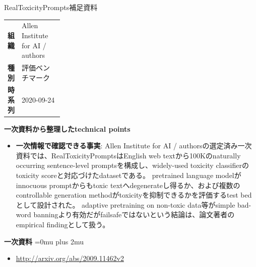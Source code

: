 \begin{technicalnote}{RealToxicityPrompts}{補足資料}
\begingroup
\begin{tabularx}{\linewidth}{@{}>{\bfseries}p{0.22\linewidth}X@{}}
組織 & Allen Institute for AI / authors \\
種別 & 評価ベンチマーク \\
時系列 & 2020-09-24 \\
\end{tabularx}
\smallskip
{\bfseries 一次資料から整理したtechnical points}
\begin{itemize}[leftmargin=1.5em,itemsep=0.35em]
\item \textbf{一次情報で確認できる事実}: Allen Institute for AI / authorsの選定済み一次資料では、RealToxicityPromptsはEnglish web textから100Kのnaturally occurring sentence-level promptsを構成し、widely-used toxicity classifierのtoxicity scoreと対応づけたdatasetである。 pretrained language modelがinnocuous promptからもtoxic textへdegenerateし得るか、および複数のcontrollable generation methodがtoxicityを抑制できるかを評価するtest bedとして設計された。 adaptive pretraining on non-toxic data等がsimple bad-word banningより有効だがfailsafeではないという結論は、論文著者のempirical findingとして扱う。
\end{itemize}
\begin{minipage}{\linewidth}
\begin{samepage}
{\bfseries 一次資料}
\begingroup\sloppy
\Urlmuskip=0mu plus 2mu\relax
\begin{itemize}[leftmargin=1.5em,itemsep=0.25em]
\item {\scriptsize\url{http://arxiv.org/abs/2009.11462v2}}
\end{itemize}
\endgroup
\end{samepage}
\end{minipage}
\endgroup
\end{technicalnote}
\medskip
